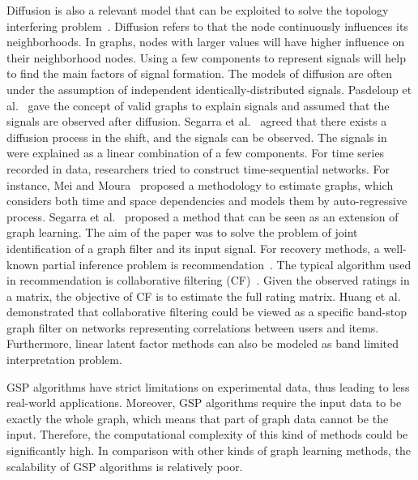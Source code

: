 Diffusion is also a relevant model that can be exploited to solve the topology interfering problem~. Diffusion refers to that the node continuously influences its neighborhoods. In graphs, nodes with larger values will have higher influence on their neighborhood nodes. Using a few components to represent signals will help to find the main factors of signal formation. The models of diffusion are often under the assumption of independent identically-distributed signals. Pasdeloup et al.~ gave the concept of valid graphs to explain signals and assumed that the signals are observed after diffusion. Segarra et al.~ agreed that there exists a diffusion process in the shift, and the signals can be observed. The signals in~ were explained as a linear combination of a few components.
For time series recorded in data, researchers tried to construct time-sequential networks. For instance, Mei and Moura~ proposed a methodology to estimate graphs, which considers both time and space dependencies and models them by auto-regressive process. Segarra et al.~ proposed a method that can be seen as an extension of graph learning. The aim of the paper was to solve the problem of joint identification of a graph filter and its input signal.
For recovery methods, a well-known partial inference problem is recommendation~. The typical algorithm used in recommendation is collaborative filtering (CF)~. Given the observed ratings in a matrix, the objective of CF is to estimate the full rating matrix. Huang et al.~ demonstrated that collaborative filtering could be viewed as a specific band-stop graph filter on networks representing correlations between users and items. Furthermore, linear latent factor methods can also be modeled as band limited interpretation problem.

GSP algorithms have strict limitations on experimental data, thus leading to less real-world applications. Moreover, GSP algorithms require the input data to be exactly the whole graph, which means that part of graph data cannot be the input. Therefore, the computational complexity of this kind of methods could be significantly high. In comparison with other kinds of graph learning methods, the scalability of GSP algorithms is relatively poor.

